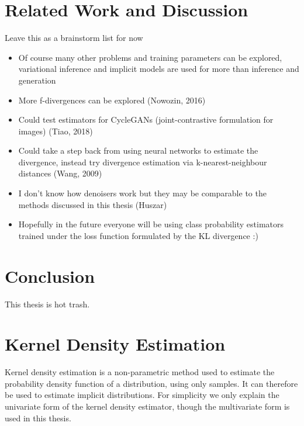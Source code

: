 \documentclass[honours,12pt]{unswthesis}
\numberwithin{equation}{section}
\theoremstyle{definition}
\begin{document}
\chapter{Related Work and Discussion}
Leave this as a brainstorm list for now
\begin{itemize}
\item Of course many other problems and training parameters can be explored, variational inference and implicit models are used for more than inference and generation
\item More f-divergences can be explored (Nowozin, 2016)
\item Could test estimators for CycleGANs (joint-contrastive formulation for images) (Tiao, 2018)
\item Could take a step back from using neural networks to estimate the divergence, instead try divergence estimation via k-nearest-neighbour distances (Wang, 2009)
\item I don't know how denoisers work but they may be comparable to the methods discussed in this thesis (Huszar)
\item Hopefully in the future everyone will be using class probability estimators trained under the loss function formulated by the KL divergence :)
\end{itemize}
\chapter{Conclusion}
This thesis is hot trash.


\clearpage
{}





\newpage
\appendix
\chapter{Kernel Density Estimation}
Kernel density estimation is a non-parametric method used to estimate the probability density function of a distribution, using only samples. It can therefore be used to estimate implicit distributions. For simplicity we only explain the univariate form of the kernel density estimator, though the multivariate form is used in this thesis.
\end{document}
